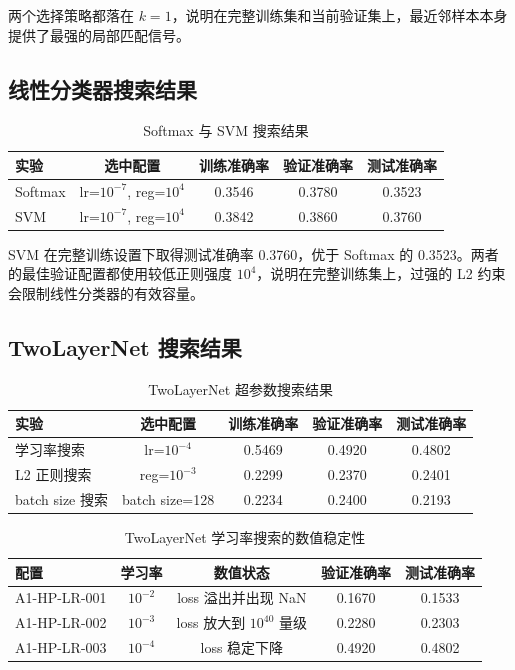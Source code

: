 \documentclass[UTF8]{ctexart}
\begin{document}
两个选择策略都落在 $k=1$，说明在完整训练集和当前验证集上，最近邻样本本身提供了最强的局部匹配信号。

\subsection{线性分类器搜索结果}

\begin{table}[H]
\centering
\begin{tabular}{lcccc}
\toprule
实验 & 选中配置 & 训练准确率 & 验证准确率 & 测试准确率 \\
\midrule
Softmax & lr=$10^{-7}$, reg=$10^4$ & 0.3546 & 0.3780 & 0.3523 \\
SVM & lr=$10^{-7}$, reg=$10^4$ & 0.3842 & 0.3860 & 0.3760 \\
\bottomrule
\end{tabular}
\caption{Softmax 与 SVM 搜索结果}
\end{table}

SVM 在完整训练设置下取得测试准确率 0.3760，优于 Softmax 的 0.3523。两者的最佳验证配置都使用较低正则强度 $10^4$，说明在完整训练集上，过强的 L2 约束会限制线性分类器的有效容量。

\subsection{TwoLayerNet 搜索结果}

\begin{table}[H]
\centering
\begin{tabular}{lcccc}
\toprule
实验 & 选中配置 & 训练准确率 & 验证准确率 & 测试准确率 \\
\midrule
学习率搜索 & lr=$10^{-4}$ & 0.5469 & 0.4920 & 0.4802 \\
L2 正则搜索 & reg=$10^{-3}$ & 0.2299 & 0.2370 & 0.2401 \\
batch size 搜索 & batch size=128 & 0.2234 & 0.2400 & 0.2193 \\
\bottomrule
\end{tabular}
\caption{TwoLayerNet 超参数搜索结果}
\end{table}

\begin{table}[H]
\centering
\begin{tabular}{lcccc}
\toprule
配置 & 学习率 & 数值状态 & 验证准确率 & 测试准确率 \\
\midrule
A1-HP-LR-001 & $10^{-2}$ & loss 溢出并出现 NaN & 0.1670 & 0.1533 \\
A1-HP-LR-002 & $10^{-3}$ & loss 放大到 $10^{40}$ 量级 & 0.2280 & 0.2303 \\
A1-HP-LR-003 & $10^{-4}$ & loss 稳定下降 & 0.4920 & 0.4802 \\
\bottomrule
\end{tabular}
\caption{TwoLayerNet 学习率搜索的数值稳定性}
\end{table}
\end{document}
